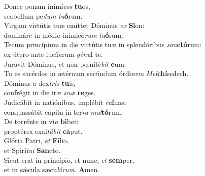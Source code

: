 \evenverse Donec ponam inimí\textit{cos} \textbf{tu}os,~\*\\
\evenverse scabéllum pe\textit{dum} \textit{tu}\textbf{ó}rum.\\
\oddverse Virgam virtútis tuæ emíttet Dóminus \textit{ex} \textbf{Si}on:~\*\\
\oddverse domináre in médio inimicó\textit{rum} \textit{tu}\textbf{ó}rum.\\
\evenverse Tecum princípium in die virtútis tuæ in splendóribus \textit{san}\textbf{ctó}rum:~\*\\
\evenverse ex útero ante lucíferum \textit{gé}\textit{nu}\textbf{i} te.\\
\oddverse Jurávit Dóminus, et non pœnité\textit{bit} \textbf{e}um:~\*\\
\oddverse Tu es sacérdos in ætérnum secúndum órdi\textit{nem} \textit{Mel}\textbf{chí}sedech.\\
\evenverse Dóminus a dex\textit{tris} \textbf{tu}is,~\*\\
\evenverse confrégit in die iræ \textit{su}\textit{æ} \textbf{re}ges.\\
\oddverse Judicábit in natiónibus, implébit \textit{ru}\textbf{í}nas:~\*\\
\oddverse conquassábit cápita in ter\textit{ra} \textit{mul}\textbf{tó}rum.\\
\evenverse De torrénte in vi\textit{a} \textbf{bi}bet:~\*\\
\evenverse proptérea exal\textit{tá}\textit{bit} \textbf{ca}put.\\
\oddverse Glória Patri, \textit{et} \textbf{Fí}lio,~\*\\
\oddverse et Spirí\textit{tu}\textit{i} \textbf{San}cto.\\
\evenverse Sicut erat in princípio, et nunc, \textit{et} \textbf{sem}per,~\*\\
\evenverse et in sǽcula sæcu\textit{ló}\textit{rum}. \textbf{A}men.\\
